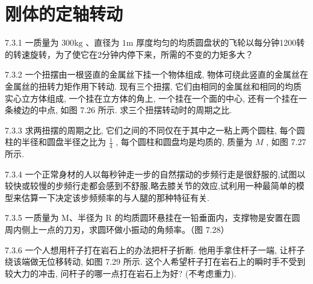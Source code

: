 \section{刚体的定轴转动}

\begin{problem}{7.3.1}
一质量为 $300\mathrm{kg}$ 、直径为 $1\mathrm{m}$ 厚度均匀的均质圆盘状的飞轮以每分钟1200转的转速旋转，为了使它在2分钟内停下来，所需的不变的力矩多大？
\end{problem}
\clearpage


\begin{problem}{7.3.2}
一个扭摆由一根竖直的金属丝下挂一个物体组成, 物体可绕此竖直的金属丝在金属丝的扭转力矩作用下转动. 现有三个扭摆, 它们由相同的金属丝和相同的均质实心立方体组成, 一个挂在立方体的角上, 一个挂在一个面的中心, 还有一个挂在一条棱边的中点, 如图 7.26 所示. 求三个扭摆转动时的周期之比.
\begin{center}

\end{center}
\end{problem}
\clearpage


\begin{problem}{7.3.3}
求两扭摆的周期之比, 它们之间的不同仅在于其中之一粘上两个圆柱, 每个圆柱的半径和圆盘半径之比为 $\frac{1}{4}$ , 每个圆柱和圆盘均是均质的, 质量为 $M$ , 如图 7.27 所示.
\begin{center}

\end{center}
\end{problem}
\clearpage


\begin{problem}{7.3.4}
一个正常身材的人以每秒钟走一步的自然摆动的步频行走是很舒服的,试图以较快或较慢的步频行走都会感到不舒服,略去膝关节的效应,试利用一种最简单的模型来估算一下决定该步频频率的与人腿的那种特征有关.
\end{problem}
\clearpage


\begin{problem}{7.3.5}
一质量为 M、半径为 R 的均质圆环悬挂在一铅垂面内，支撑物是安置在圆周内侧上一点的刀刃，求圆环做小振动的角频率。（图 7.28）
\begin{center}

\end{center}
\end{problem}
\clearpage


\begin{problem}{7.3.6}
一个人想用杆子打在岩石上的办法把杆子折断. 他用手拿住杆子一端, 让杆子绕该端做无位移转动, 如图 7.29 所示. 这个人希望杆子打在岩石上的瞬时手不受到较大力的冲击, 问杆子的哪一点打在岩石上为好? (不考虑重力).
\begin{center}

\end{center}
\end{problem}
\clearpage


